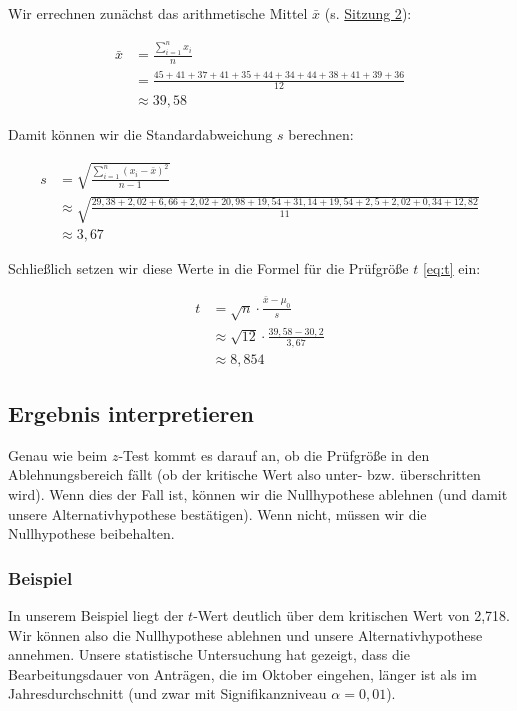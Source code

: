 \documentclass[
  11pt,
  ngerman,
  a4paper,
]{report}
\begin{document}
Wir errechnen zunächst das arithmetische Mittel \(\bar{x}\) (s. \protect\hyperlink{arithmetisches-mittel}{Sitzung 2}):

\[\begin{aligned}
\bar{x}&=\frac{\sum\limits_{i=1}^nx_i}{n}\\[5pt]
&=\frac{45+41+37+41+35+44+34+44+38+41+39+36}{12}\\
&\approx 39{,}58
\end{aligned}\]

Damit können wir die Standardabweichung \(s\) berechnen:

\[\begin{aligned}
s&=\sqrt{\frac{\sum\limits_{i=1}^n(x_i-\bar{x})^2}{n-1}}\\[6pt]
&\approx\sqrt{\frac{29{,}38+2{,}02+6{,}66+2{,}02+20{,}98+19{,}54+31{,}14+19{,}54+2{,}5+2{,}02+0{,}34+12{,}82}{11}}\\
&\approx 3{,}67
\end{aligned}\]

Schließlich setzen wir diese Werte in die Formel für die Prüfgröße \(t\) \eqref{eq:t} ein:

\[\begin{aligned}
t&=\sqrt{n}\cdot\frac{\bar{x}-\mu_0}{s}\\[6pt]
&\approx\sqrt{12}\cdot\frac{39{,}58-30{,}2}{3{,}67}\\
&\approx8{,}854
\end{aligned}\]

\hypertarget{ergebnis-interpretieren}{%
\subsection{Ergebnis interpretieren}\label{ergebnis-interpretieren}}

Genau wie beim \(z\)-Test kommt es darauf an, ob die Prüfgröße in den Ablehnungsbereich fällt (ob der kritische Wert also unter- bzw. überschritten wird). Wenn dies der Fall ist, können wir die Nullhypothese ablehnen (und damit unsere Alternativhypothese bestätigen). Wenn nicht, müssen wir die Nullhypothese beibehalten.

\hypertarget{beispiel-10}{%
\subsubsection{Beispiel}\label{beispiel-10}}

In unserem Beispiel liegt der \(t\)-Wert deutlich über dem kritischen Wert von 2,718. Wir können also die Nullhypothese ablehnen und unsere Alternativhypothese annehmen. Unsere statistische Untersuchung hat gezeigt, dass die Bearbeitungsdauer von Anträgen, die im Oktober eingehen, länger ist als im Jahresdurchschnitt (und zwar mit Signifikanzniveau \(\alpha=0,01\)).
\end{document}
